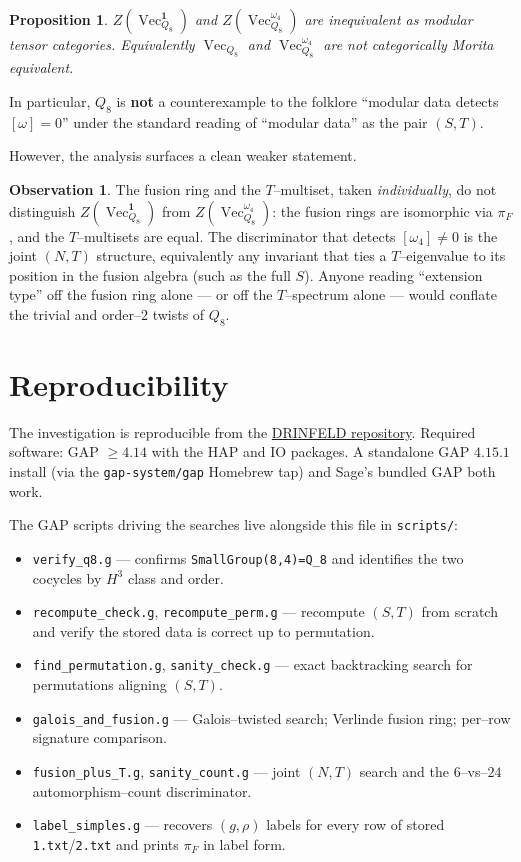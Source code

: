 \documentclass[11pt,a4paper]{amsart}
\theoremstyle{plain}
\newtheorem{proposition}[theorem]{Proposition}
\theoremstyle{definition}
\newtheorem{observation}[theorem]{Observation}
\DeclareMathOperator{\Vec}{Vec}
\newcommand{\Drinfeld}[2]{Z\!\left(\Vec_{#1}^{#2}\right)}
\newcommand{\trivcoc}{\mathbf{1}}
\begin{document}
\begin{proposition}
$\Drinfeld{Q_8}{\trivcoc}$ and $\Drinfeld{Q_8}{\omega_4}$ are
inequivalent as modular tensor categories. Equivalently
$\Vec_{Q_8}$ and $\Vec_{Q_8}^{\omega_4}$ are not categorically Morita
equivalent.
\end{proposition}

In particular, $Q_8$ is \textbf{not} a counterexample to the folklore
``modular data detects $[\omega]=0$'' under the standard reading of
``modular data'' as the pair $(S,T)$.

\medskip
\noindent
However, the analysis surfaces a clean weaker statement.

\begin{observation}
The fusion ring and the $T$--multiset, taken \emph{individually}, do not
distinguish $\Drinfeld{Q_8}{\trivcoc}$ from $\Drinfeld{Q_8}{\omega_4}$:
the fusion rings are isomorphic via $\pi_F$, and the $T$--multisets are
equal. The discriminator that detects $[\omega_4]\ne 0$ is the joint
$(N,T)$ structure, equivalently any invariant that ties a $T$--eigenvalue
to its position in the fusion algebra (such as the full $S$).
Anyone reading ``extension type'' off the fusion ring alone --- or off
the $T$--spectrum alone --- would conflate the trivial and order--$2$
twists of $Q_8$.
\end{observation}

\section*{Reproducibility}

The investigation is reproducible from the
\href{https://github.com/thomas-gemunden/DRINFELD}{DRINFELD repository}.
Required software: GAP $\ge 4.14$ with the \textsf{HAP} and \textsf{IO}
packages. A standalone GAP $4.15.1$ install (via the
\verb|gap-system/gap| Homebrew tap) and Sage's bundled GAP both work.

The GAP scripts driving the searches live alongside this file in
\verb|scripts/|:

\begin{itemize}\itemsep0pt
\item \verb|verify_q8.g| --- confirms \verb|SmallGroup(8,4)=Q_8| and
      identifies the two cocycles by $H^3$ class and order.
\item \verb|recompute_check.g|, \verb|recompute_perm.g| --- recompute
      $(S,T)$ from scratch and verify the stored data is correct up to
      permutation.
\item \verb|find_permutation.g|, \verb|sanity_check.g| --- exact
      backtracking search for permutations aligning $(S,T)$.
\item \verb|galois_and_fusion.g| --- Galois--twisted search; Verlinde
      fusion ring; per--row signature comparison.
\item \verb|fusion_plus_T.g|, \verb|sanity_count.g| --- joint
      $(N,T)$ search and the $6$--vs--$24$ automorphism--count
      discriminator.
\item \verb|label_simples.g| --- recovers $(g,\rho)$ labels for every
      row of stored \verb|1.txt|/\verb|2.txt| and prints $\pi_F$ in
      label form.
\end{itemize}
\end{document}
